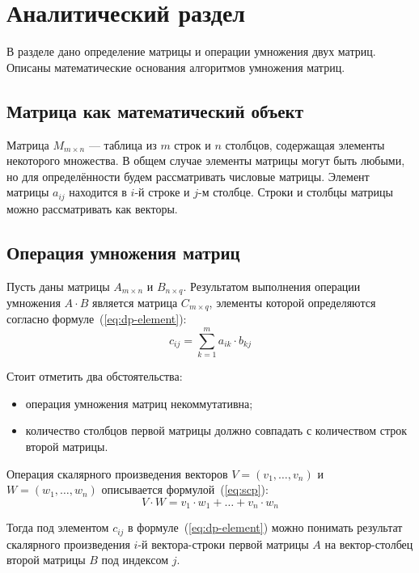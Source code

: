 \chapter{Аналитический раздел}

В разделе дано определение матрицы и операции умножения двух матриц. Описаны математические основания алгоритмов умножения матриц.

\section{Матрица как математический объект}
\label{chap:matrix-def}
Матрица $M_{m \times n}$ — таблица из $m$ строк и $n$ столбцов, содержащая элементы некоторого множества. В общем случае элементы матрицы могут быть любыми, но для определённости будем рассматривать числовые матрицы. Элемент матрицы $a_{ij}$ находится в $i$-й строке и $j$-м столбце. Строки и столбцы матрицы можно рассматривать как векторы.

\section{Операция умножения матриц}

\label{chap:dp-def}
Пусть даны матрицы $A_{m \times n}$ и $B_{n \times q}$. Результатом выполнения операции умножения $A \cdot B$ является матрица $C_{m \times q}$, элементы которой определяются согласно формуле~(\ref{eq:dp-element}): 
\begin{equation}
    \label{eq:dp-element}
    c_{ij} = \sum_{k=1}^m a_{ik} \cdot b_{kj}
\end{equation}

Стоит отметить два обстоятельства:
\begin{itemize}[label=--]
    \item операция умножения матриц некоммутативна;
    \item количество столбцов первой матрицы должно совпадать с количеством строк второй матрицы.
\end{itemize}

Операция скалярного произведения векторов $V = (v_1, \ldots, v_n)$ и $W = (w_1, \ldots, w_n)$ описывается формулой~(\ref{eq:scp}):
\begin{equation}
    \label{eq:scp}
    V \cdot W = v_1 \cdot w_1 + \ldots + v_n \cdot w_n
\end{equation}

Тогда под элементом $c_{ij}$ в формуле~(\ref{eq:dp-element}) можно понимать результат скалярного произведения $i$-й вектора-строки первой матрицы $A$ на вектор-столбец второй матрицы $B$ под индексом $j$.

